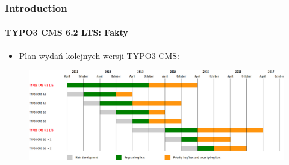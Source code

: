
\begin{frame}[fragile]
	\frametitle{Introduction}
	\framesubtitle{TYPO3 CMS 6.2 LTS: Fakty}

	\begin{itemize}
		\item Plan wydań kolejnych wersji TYPO3 CMS:
	\end{itemize}

	\begin{figure}
		\includegraphics[width=0.99\linewidth]{Images/Introduction/ReleaseAgenda.png}
	\end{figure}

\end{frame}


